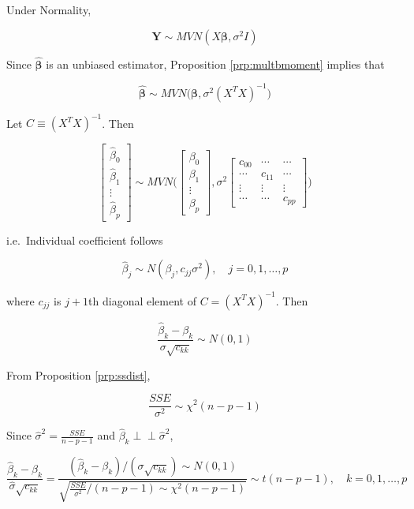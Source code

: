\documentclass[]{book}
\theoremstyle{definition}
\theoremstyle{definition}
\theoremstyle{definition}
\theoremstyle{remark}
\begin{document}
Under Normality,

\[\mathbf{Y} \sim MVN(X\boldsymbol\beta, \sigma^2I)\]

Since \(\boldsymbol{\hat\beta}\) is an unbiased estimator, Proposition \ref{prp:multbmoment} implies that

\begin{equation}
  \boldsymbol{\hat\beta}\sim MVN\bigg( \boldsymbol\beta, \sigma^2(X^TX)^{-1} \bigg)
  \label{eq:hbdist}
\end{equation}

Let \(C \equiv (X^TX)^{-1}\). Then

\[
\begin{bmatrix}
  \hat\beta_0 \\ \hline
  \hat\beta_1 \\ \hline
  \vdots \\ \hline
  \hat\beta_p
\end{bmatrix} \sim MVN\Bigg( \begin{bmatrix}
  \beta_0 \\ \hline
  \beta_1 \\ \hline
  \vdots \\ \hline
  \beta_p
\end{bmatrix}, \sigma^2\begin{bmatrix}
  c_{00} & \cdots & \cdots \\ \hline
  \cdots & c_{11} & \cdots \\ \hline
  \vdots & \vdots & \vdots \\ \hline
  \cdots & \cdots & c_{pp}
\end{bmatrix} \Bigg)
\]

i.e.~Individual coefficient follows

\[\hat\beta_j \sim N(\beta_j, c_{jj}\sigma^2), \quad j = 0, 1, \ldots, p\]

where \(c_{jj}\) is \(j + 1\)th diagonal element of \(C = (X^TX)^{-1}\). Then

\begin{equation}
  \frac{\hat\beta_k - \beta_k}{\sigma\sqrt{c_{kk}}} \sim N(0, 1)
  \label{eq:bejzdist}
\end{equation}

From Proposition \ref{prp:ssdist},

\[\frac{SSE}{\sigma^2} \sim \chi^2(n - p - 1)\]

Since \(\hat\sigma^2 = \frac{SSE}{n - p - 1}\) and \(\hat\beta_k \perp\!\!\!\perp\hat\sigma^2\),

\begin{equation}
  \frac{\hat\beta_k - \beta_k}{\hat\sigma\sqrt{c_{kk}}} = \frac{(\hat\beta_k - \beta_k) / (\sigma\sqrt{c_{kk}}) \sim N(0, 1)}{\sqrt{\frac{SSE}{\sigma^2} / (n - p - 1) \sim \chi^2(n - p - 1)}} \sim t(n - p - 1), \quad k = 0, 1, \ldots, p
  \label{eq:bejtdist}
\end{equation}
\end{document}
